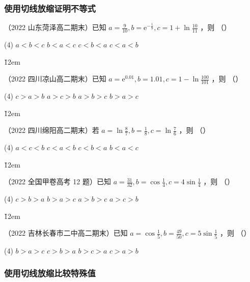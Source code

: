 \subsubsection{使用切线放缩证明不等式}

\begin{example}
    （2022 山东菏泽高二期末）已知 $a=\frac{9}{10}, b=\mathrm{e}^{-\frac{1}{9}}, c=1+\ln \frac{10}{11}$ ，则 （\quad）
    \begin{tasks}(4)
        \task $a<b<c$
        \task $b<a<c$
        \task $c<b<a$
        \task $c<a<b$
    \end{tasks}
\end{example}

\v{12em}

\begin{example}
    （2022 四川凉山高二期末）已知 $a=\mathrm{e}^{0.01}, b=1.01, c=1-\ln \frac{100}{101}$ ，则 （\quad）
    \begin{tasks}(4)
        \task $c>a>b$
        \task $a>c>b$
        \task $a>b>c$
        \task $b>a>c$
    \end{tasks}
\end{example}

\v{12em}

\begin{example}
    （2022 四川绵阳高二期末）若 $a=\ln \frac{8}{7}, b=\frac{1}{8}, c=\ln \frac{7}{6}$ ，则 （\quad）
    \begin{tasks}(4)
        \task $a<c<b$
        \task $c<a<b$
        \task $c<b<a$
        \task $b<a<c$
    \end{tasks}
\end{example}

\v{12em}

\begin{example}
    （2022 全国甲卷高考 12 题）已知 $a=\frac{31}{32}, b=\cos \frac{1}{4}, c=4 \sin \frac{1}{4}$ ，则 （\quad）
    \begin{tasks}(4)
        \task $c>b>a$
        \task $b>a>c$
        \task $a>b>c$
        \task $a>c>b$
    \end{tasks}
\end{example}

\v{12em}

\begin{example}
    （2022 吉林长春市二中高二期末）已知 $a=\cos \frac{1}{5}, b=\frac{49}{50}, c=5 \sin \frac{1}{5}$ ，则 （\quad）
    \begin{tasks}(4)
        \task $b>a>c$
        \task $c>b>a$
        \task $b>c>a$
        \task $c>a>b$
    \end{tasks}
\end{example}


\subsubsection{使用切线放缩比较特殊值}
